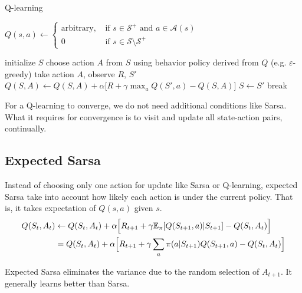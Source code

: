 \documentclass[../../main.tex]{subfiles}
\begin{document}
        {Q-learning}
        {\inputitem{$\alpha \in (0,1]$}{step size parameter}}
        {}
        {
            {$Q(s,a) \leftarrow
            \begin{cases}
                \text{arbitrary,} &\text{ if $s \in \mathcal{S}^+$ and $a \in \mathcal{A}(s)$} \\
                0 &\text{ if $s \in \mathcal{S} \setminus \mathcal{S}^+$}
            \end{cases}$\;}

            {
                initialize $S$\;
                {
                    choose action $A$ from $S$ using behavior policy derived from $Q$ (e.g. $\varepsilon$-greedy)\;
                    take action $A$, observe $R$, $S'$\;
                    $Q(S,A) \leftarrow Q(S,A) + \alpha \big[ R + \gamma \max_a{Q(S',a)} - Q(S,A) \big]$\;
                    $S \leftarrow S'$\;
                    {
                        break
                    }
                }
            }
        }

        For a Q-learning to converge, we do not need additional conditions like Sarsa. What it requires for convergence is
        to visit and update all state-action pairs, continually.

    \subsection{Expected Sarsa}
        Instead of choosing only one action for update like Sarsa or Q-learning, expected Sarsa take into account how likely
        each action is under the current policy. That is, it takes expectation of $Q(s,a)$ given $s$.
        \begin{align}
            Q(S_t,A_t)
            &\leftarrow Q(S_t,A_t) + \alpha\Big[ R_{t+1} + \gamma \mathbb{E}_\pi[Q(S_{t+1}, a) | S_{t+1}] - Q(S_t,A_t) \Big] \\
            &= Q(S_t,A_t) + \alpha\Big[ R_{t+1} + \gamma \sum_a \pi(a|S_{t+1})Q(S_{t+1},a) - Q(S_t,A_t) \Big] \label{eq:expectedSarsa}
        \end{align}
        
        Expected Sarsa eliminates the variance due to the random selection of $A_{t+1}$. It generally learns better than Sarsa.
\end{document}
